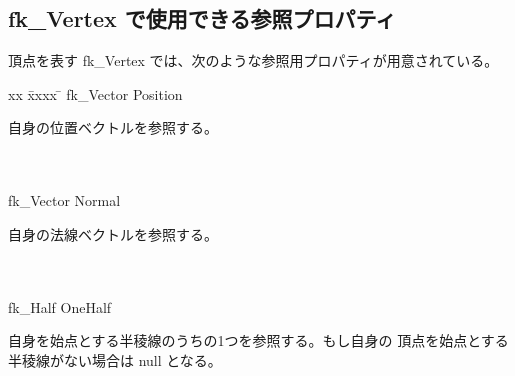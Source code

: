 \subsection{fk\_Vertex で使用できる参照プロパティ}
頂点を表す fk\_Vertex では、次のような参照用プロパティが用意されている。
\begin{tabbing}
xx \= xxxx \= \kill
\> fk\_Vector Position \\
	\> \> \begin{minipage}[]{15cm}
		自身の位置ベクトルを参照する。
	\end{minipage} \\ \\

\> fk\_Vector Normal \\
	\> \> \begin{minipage}[]{15cm}
		自身の法線ベクトルを参照する。
	\end{minipage} \\ \\

\> fk\_Half OneHalf \\
	\> \> \begin{minipage}[]{15cm}
		自身を始点とする半稜線のうちの1つを参照する。もし自身の
		頂点を始点とする半稜線がない場合は null となる。
	\end{minipage}
\end{tabbing}

